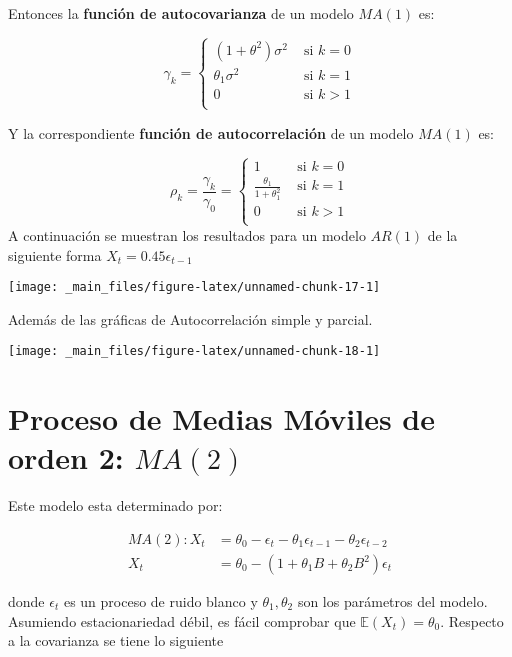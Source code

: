 \documentclass[
  a4paper,
  oneside,
  openany]{book}
\begin{document}
Entonces la \textbf{función de autocovarianza} de un modelo \(MA(1)\) es:

\[
\gamma_k = \left\{
\begin{array}{lr}
(1+\theta^2)\sigma^2 &   \mbox{ si } k=0\\
\theta_1 \sigma^2 & \mbox{ si } k=1\\
0 &    \mbox{ si } k>1\\
\end{array}
\right.
\]

Y la correspondiente \textbf{función de autocorrelación} de un modelo \(MA(1)\) es:

\[
\rho_k = \frac{\gamma_k}{\gamma_0} = \left\{
\begin{array}{lr}
1 &  \mbox{ si } k=0\\
\frac{\theta_1}{1+\theta_1^2} &  \mbox{ si } k=1\\
0 & \mbox{ si } k>1\\
\end{array}
\right.
\]
A continuación se muestran los resultados para un modelo \(AR(1)\) de la siguiente forma \(X_t=0.45\epsilon_{t-1}\)

\begin{center}\texttt{[image: \_main\_files/figure-latex/unnamed-chunk-17-1]} \end{center}

Además de las gráficas de Autocorrelación simple y parcial.

\begin{center}\texttt{[image: \_main\_files/figure-latex/unnamed-chunk-18-1]} \end{center}

\hypertarget{proceso-de-medias-muxf3viles-de-orden-2-ma2}{%
\section{\texorpdfstring{Proceso de Medias Móviles de orden 2: \(MA(2)\)}{Proceso de Medias Móviles de orden 2: MA(2)}}\label{proceso-de-medias-muxf3viles-de-orden-2-ma2}}

Este modelo esta determinado por:

\[
\begin{split}
MA(2): X_t & = \theta_0-\epsilon_t-\theta_1\epsilon_{t-1}-\theta_2\epsilon_{t-2}\\
X_t & = \theta_0-(1+\theta_1 B+\theta_2B^2)\epsilon_{t}
\end{split}
\]

donde \(\epsilon_t\) es un proceso de ruido blanco y \(\theta_1,\theta_2\) son los parámetros del modelo. Asumiendo estacionariedad débil, es fácil comprobar que \(\mathbb{E}(X_t) = \theta_0\). Respecto a la covarianza se tiene lo siguiente
\end{document}
